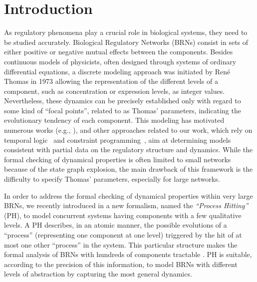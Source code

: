 \section{Introduction}
As regulatory phenomena play a crucial role in biological systems, they need to be studied accurately.
Biological Regulatory Networks (BRNs) consist in sets of either positive or negative mutual effects between the components.
Besides continuous models of physicists, often designed through systems of ordinary
differential equations, a discrete modeling approach was initiated by René Thomas in 1973
\cite{Thomas73} allowing the representation of the different levels of a component, such as concentration or expression levels, as integer values.
Nevertheless, these dynamics can be precisely established only with regard to some kind of ``focal points'', related to as Thomas' parameters, indicating the evolutionary tendency of each component.
This modeling has motivated numerous works (e.g.,
\cite{RiCo07,Naldi09,Siebert06,Ahmad08}), %
and other approaches related to our work, which rely on temporal logic~\cite{Khalis09} and constraint programming~\cite{20646302,DBLP:conf/ipcat/CorblinFTCT12},
aim at determining models consistent with partial data on the regulatory structure and dynamics.
While the formal checking of dynamical properties is often limited to small networks because of the
state graph explosion, the main drawback of this framework is the difficulty to specify Thomas'
parameters, especially for large networks.

In order to address the formal checking of dynamical properties within very large BRNs, we recently
introduced in \cite{PMR10-TCSB} a new formalism, named the \emph{``Process Hitting''} (PH), to model
concurrent systems having components with a few qualitative levels.
A PH describes, in an atomic manner, the possible evolutions of a “process” (representing one
component at one level) triggered by the hit of at most one other “process” in the system.
This particular structure makes the formal analysis of BRNs with hundreds of components tractable \cite{PMR12-MSCS}.
PH is suitable, according to the precision of this information, to model BRNs with different levels of abstraction by capturing the most general dynamics.


